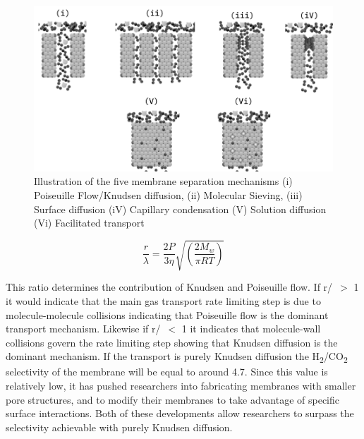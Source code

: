 \begin{figure}
    \includegraphics[width=\linewidth]{figures/septype.png}
    \caption{Illustration of the five membrane separation mechanisms (i) Poiseuille Flow/Knudsen diffusion, (ii) Molecular Sieving, (iii) Surface diffusion (iV) Capillary condensation (V) Solution diffusion (Vi) Facilitated transport}
    \label{fig:1}
  \end{figure}

\begin{equation}\label{eq:6}
    \frac{r}{\lambda} = \frac{2P}{3\eta}\sqrt{\left(\frac{2M_w}{\pi RT} \right)}
\end{equation}

This ratio determines the contribution of Knudsen and Poiseuille flow. If r/\textlambda \ $>$ 1 it would indicate 
that the main gas transport rate limiting step is due to molecule-molecule collisions indicating that 
Poiseuille flow is the dominant transport mechanism. Likewise if r/\textlambda \ $<$ 1 it indicates that 
molecule-wall collisions govern the rate limiting step showing that Knudsen diffusion is the dominant 
mechanism. If the transport is purely Knudsen diffusion the H\textsubscript{2}/CO\textsubscript{2} selectivity of 
the membrane will be equal to around 4.7. Since this value is relatively low, it has pushed researchers 
into fabricating membranes with smaller pore structures, and to modify their membranes to take advantage of 
specific surface interactions. Both of these developments allow researchers to surpass the selectivity 
achievable with purely Knudsen diffusion.

